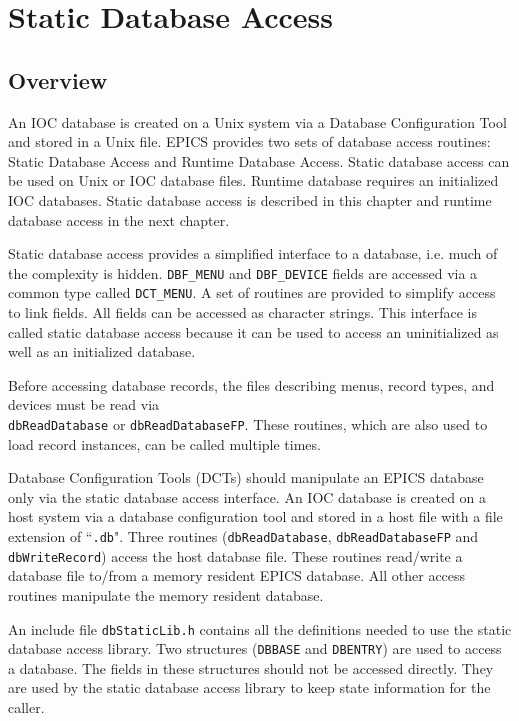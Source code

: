 \chapter{Static Database Access}

\section{Overview}

An IOC database is created on a Unix system via a Database Configuration Tool and stored in a Unix file. EPICS provides 
two sets of database access routines: Static Database Access and Runtime Database Access. Static database access can be 
used on Unix or IOC database files. Runtime database requires an initialized IOC databases. Static database access is 
described in this chapter and runtime database access in the next chapter.

Static database access provides a simplified interface to a database, i.e. much of the complexity is hidden. \verb|DBF_MENU| and 
\verb|DBF_DEVICE| fields are accessed via a common type called \verb|DCT_MENU|. A set of routines are provided to simplify access 
to link fields. All fields can be accessed as character strings. This interface is called static database access because it can 
be used to access an uninitialized as well as an initialized database.

Before accessing database records, the files describing menus, record types, and devices must be read via \\
\verb|dbReadDatabase| or \verb|dbReadDatabaseFP|. These routines, which are also used to load record instances, can be 
called multiple times.

Database Configuration Tools (DCTs) should manipulate an EPICS database only via the static database access interface. 
An IOC database is created on a host system via a database configuration tool and stored in a host file with a file 
extension of ``\verb|.db|". Three routines (\verb|dbReadDatabase|, \verb|dbReadDatabaseFP| and \verb|dbWriteRecord|) access the 
host database file. These routines read/write a database file to/from a memory resident EPICS database. All other access 
routines manipulate the memory resident database.

An include file \verb|dbStaticLib.h| contains all the definitions needed to use the static database access library. Two 
structures (\verb|DBBASE| and \verb|DBENTRY|) are used to access a database. The fields in these structures should not be accessed 
directly. They are used by the static database access library to keep state information for the caller.

